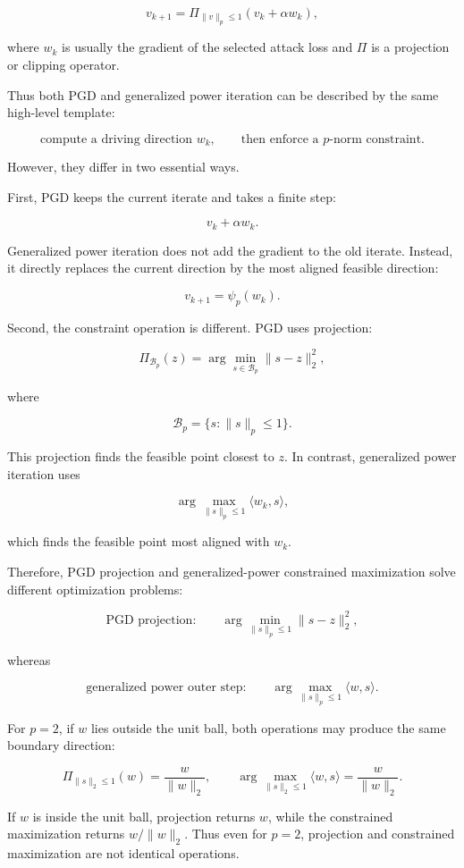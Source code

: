 \documentclass{article}
\begin{document}
\[
v_{k+1}
=
\Pi_{\|v\|_p\le 1}
\left(
v_k+\alpha w_k
\right),
\]

where \(w_k\) is usually the gradient of the selected attack loss and \(\Pi\) is a projection or clipping operator.

Thus both PGD and generalized power iteration can be described by the same high-level template:

\[
\text{compute a driving direction } w_k,
\qquad
\text{then enforce a } p\text{-norm constraint}.
\]

However, they differ in two essential ways.

First, PGD keeps the current iterate and takes a finite step:

\[
v_k+\alpha w_k.
\]

Generalized power iteration does not add the gradient to the old iterate. Instead, it directly replaces the current direction by the most aligned feasible direction:

\[
v_{k+1}
=
\psi_p(w_k).
\]

Second, the constraint operation is different. PGD uses projection:

\[
\Pi_{\mathcal{B}_p}(z)
=
\arg\min_{s\in\mathcal{B}_p}
\|s-z\|_2^2,
\]

where

\[
\mathcal{B}_p=\{s:\|s\|_p\le 1\}.
\]

This projection finds the feasible point closest to \(z\). In contrast, generalized power iteration uses

\[
\arg\max_{\|s\|_p\le1}
\langle w_k,s\rangle,
\]

which finds the feasible point most aligned with \(w_k\).

Therefore, PGD projection and generalized-power constrained maximization solve different optimization problems:

\[
\text{PGD projection:}
\qquad
\arg\min_{\|s\|_p\le1}\|s-z\|_2^2,
\]

whereas

\[
\text{generalized power outer step:}
\qquad
\arg\max_{\|s\|_p\le1}\langle w,s\rangle.
\]

For \(p=2\), if \(w\) lies outside the unit ball, both operations may produce the same boundary direction:

\[
\Pi_{\|s\|_2\le1}(w)
=
\frac{w}{\|w\|_2},
\qquad
\arg\max_{\|s\|_2\le1}\langle w,s\rangle
=
\frac{w}{\|w\|_2}.
\]

If \(w\) is inside the unit ball, projection returns \(w\), while the constrained maximization returns \(w/\|w\|_2\). Thus even for \(p=2\), projection and constrained maximization are not identical operations.
\end{document}
